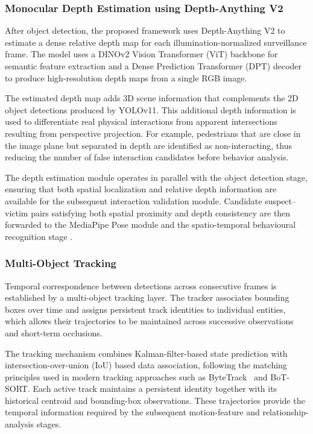 \documentclass[conference]{IEEEtran}
\begin{document}
\subsubsection{Monocular Depth Estimation using Depth-Anything V2}

After object detection, the proposed framework uses Depth-Anything V2 \cite{yang2024depth} to estimate a dense relative depth map for each illumination-normalized surveillance frame. The model uses a DINOv2 Vision Transformer (ViT) backbone for semantic feature extraction and a Dense Prediction Transformer (DPT) decoder to produce high-resolution depth maps from a single RGB image.

The estimated depth map adds 3D scene information that complements the 2D object detections produced by YOLOv11. This additional depth information is used to differentiate real physical interactions from apparent intersections resulting from perspective projection. For example, pedestrians that are close in the image plane but separated in depth are identified as non-interacting, thus reducing the number of false interaction candidates before behavior analysis.



The depth estimation module operates in parallel with the object detection stage, ensuring that both spatial localization and relative depth information are available for the subsequent interaction validation module. Candidate suspect--victim pairs satisfying both spatial proximity and depth consistency are then forwarded to the MediaPipe Pose module \cite{mediapipe} and the spatio-temporal behavioural recognition stage \cite{yan2018stgcn}.

\subsubsection{Multi-Object Tracking}

Temporal correspondence between detections across consecutive
frames is established by a multi-object tracking layer. The tracker
associates bounding boxes over time and assigns persistent track identities
to individual entities, which allows their trajectories to be maintained across
successive observations and short-term occlusions.

The tracking mechanism combines Kalman-filter-based state prediction with
intersection-over-union (IoU) based data association, following the matching
principles used in modern tracking approaches such as ByteTrack~\cite{bytetrack} and
BoT-SORT. Each active track maintains a persistent identity together with
its historical centroid and bounding-box observations. These trajectories
provide the temporal information required by the subsequent motion-feature
and relationship-analysis stages.
\end{document}
